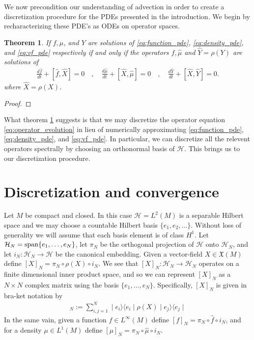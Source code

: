 \documentclass[12pt]{amsart}
\renewcommand{\H}{\ensuremath{\mathcal{H}}}
\newtheorem{thm}{Theorem}[section]
\begin{document}
We now precondition our understanding of advection in order to create 
a discretization procedure for the PDEs presented in the introduction.
We begin by recharacterizing these PDE's as ODEs on operator spaces.
\begin{thm}\label{thm:operator}
	If $f,\mu$, and $Y$ are solutions of \eqref{eq:function_pde}, \eqref{eq:density_pde}, and \eqref{eq:vf_pde} respectively
	if and only if the operators $\hat{f},\hat{\mu}$ and $\widehat{Y} = \rho(Y)$ are solutions of
	\begin{align} \label{eq:operator_evolution}
		\frac{d\hat{f}}{dt} + [ \hat{f} , \widehat{X} ] = 0 \quad,\quad
		\frac{d\hat{\mu}}{dt} + [ \widehat{X}, \hat{\mu} ] = 0 \quad,\quad
		\frac{d\widehat{Y}}{dt} + [ \widehat{X} , \widehat{Y} ] = 0.
	\end{align}
	where $\widehat{X} = \rho(X)$.
\end{thm}
\begin{proof}
\end{proof}
What theorem \ref{thm:operator} suggests is that we may discretize the operator equation \eqref{eq:operator_evolution} in lieu of numerically approximating  \eqref{eq:function_pde}, \eqref{eq:density_pde}, and \eqref{eq:vf_pde}.
In particular, we can discretize all the relevent operators spectrally by choosing an orthonormal basis of $\mathcal{H}$.
This brings us to our discretization procedure.

\section{Discretization and convergence}
\label{sec:discretization}
Let $M$ be compact and closed.  In this case $\H = L^2(M)$ is a separable Hilbert space
and we may choose a countable Hilbert basis $\{ e_1 , e_2 , \dots \}$.
Without loss of generality we will assume that each basis element is of class $H^1$.
Let $\H_N = {\rm span}\{ e_1, \dots ,e_N \}$, let
$\pi_N$ be the orthogonal projection of $\H$ onto $\H_N$,
 and let $i_N: \H_N \to \H$ be the canonical embedding.
Given a vector-field $X \in \mathfrak{X}(M)$ define $[X]_N = \pi_N \circ \rho(X) \circ i_N$.
We see that $[X]_N : \H_N \to \H_N$ 
operates on a finite dimensional inner product space,
and so we can represent $[X]_N$ as a $N\times N$ complex matrix using 
the basis $\{ e_1,\dots, e_N\}$.
Specifically, $[X]_N$ is given in bra-ket notation by
\begin{align*}
	[X]_N:= \sum_{i,j = 1}^{N} \mid e_i \rangle \langle e_i \mid \rho(X) \mid e_j \rangle  \langle e_j \mid
\end{align*}
In the same vain, given a function $f \in L^\infty(M)$ define $[f]_N = \pi_N \circ \hat{f} \circ i_N$,
and for a density $\mu \in L^1(M)$ define $[\mu]_N = \pi_N \circ \hat{\mu} \circ i_N$.
\end{document}
